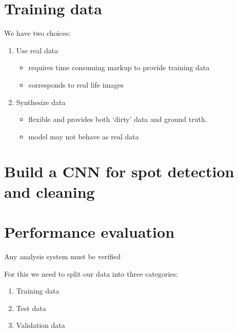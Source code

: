 \documentclass[letterpaper,10pt,english]{sphinxmanual}
\begin{document}
\section{Training data}
\label{\detokenize{ML4NeutronImageSegmentation:training-data}}
We have two choices:
\begin{enumerate}
%
\item {} 
Use real data
\begin{itemize}
\item {} 
requires time consuming markup to provide training data

\item {} 
corresponds to real life images

\end{itemize}

\item {} 
Synthesize data
\begin{itemize}
\item {} 
flexible and provides both ‘dirty’ data and ground truth.

\item {} 
model may not behave as real data

\end{itemize}

\end{enumerate}


\section{Build a CNN for spot detection and cleaning}
\label{\detokenize{ML4NeutronImageSegmentation:build-a-cnn-for-spot-detection-and-cleaning}}

\section{Performance evaluation}
\label{\detokenize{ML4NeutronImageSegmentation:performance-evaluation}}
Any analysis system must be verified

For this we need to split our data into three categories:
\begin{enumerate}
%
\item {} 
Training data

\item {} 
Test data

\item {} 
Validation data

\end{enumerate}
\end{document}
